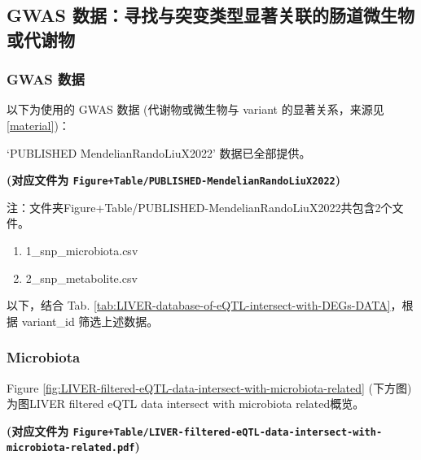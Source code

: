 \documentclass[
]{article}
\providecommand{\tightlist}{%
  \setlength{\itemsep}{0pt}\setlength{\parskip}{0pt}}
\begin{document}
\hypertarget{gwas-ux6570ux636eux5bfbux627eux4e0eux7a81ux53d8ux7c7bux578bux663eux8457ux5173ux8054ux7684ux80a0ux9053ux5faeux751fux7269ux6216ux4ee3ux8c22ux7269}{%
\subsection{GWAS 数据：寻找与突变类型显著关联的肠道微生物或代谢物}\label{gwas-ux6570ux636eux5bfbux627eux4e0eux7a81ux53d8ux7c7bux578bux663eux8457ux5173ux8054ux7684ux80a0ux9053ux5faeux751fux7269ux6216ux4ee3ux8c22ux7269}}

\hypertarget{gwas-ux6570ux636e}{%
\subsubsection{GWAS 数据}\label{gwas-ux6570ux636e}}

以下为使用的 GWAS 数据 (代谢物或微生物与 variant 的显著关系，来源见 \ref{material})：

`PUBLISHED MendelianRandoLiuX2022' 数据已全部提供。

\textbf{(对应文件为 \texttt{Figure+Table/PUBLISHED-MendelianRandoLiuX2022})}

\begin{center}\begin{tcolorbox}[colback=gray!10, colframe=gray!50, width=0.9\linewidth, arc=1mm, boxrule=0.5pt]注：文件夹Figure+Table/PUBLISHED-MendelianRandoLiuX2022共包含2个文件。

\begin{enumerate}\tightlist
\item 1\_snp\_microbiota.csv
\item 2\_snp\_metabolite.csv
\end{enumerate}\end{tcolorbox}
\end{center}

以下，结合 Tab. \ref{tab:LIVER-database-of-eQTL-intersect-with-DEGs-DATA}，根据 variant\_id 筛选上述数据。

\hypertarget{f-mic}{%
\subsubsection{Microbiota}\label{f-mic}}

Figure \ref{fig:LIVER-filtered-eQTL-data-intersect-with-microbiota-related} (下方图) 为图LIVER filtered eQTL data intersect with microbiota related概览。

\textbf{(对应文件为 \texttt{Figure+Table/LIVER-filtered-eQTL-data-intersect-with-microbiota-related.pdf})}
\end{document}
